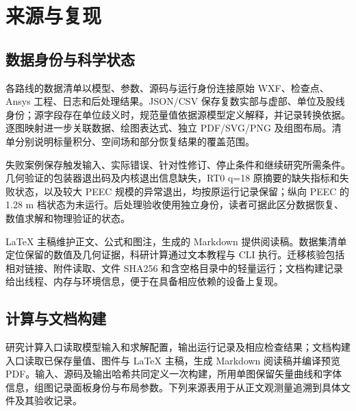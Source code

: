 \section{来源与复现}
\label{chapter:S3}

\hypertarget{S3.report_repro.heading}{}
\subsection{数据身份与科学状态}

\hypertarget{S3.report_repro.p1}{}
各路线的数据清单以模型、参数、源码与运行身份连接原始 WXF、检查点、Ansys 工程、日志和后处理结果。JSON/CSV 保存复数实部与虚部、单位及股线身份；源字段存在单位歧义时，规范量值依据源模型定义解释，并记录转换依据。逐图映射进一步关联数据、绘图表达式、独立 PDF/SVG/PNG 及组图布局。清单分别说明标量积分、空间场和部分恢复结果的覆盖范围。

\hypertarget{S3.report_repro.p2}{}
失败案例保存触发输入、实际错误、针对性修订、停止条件和继续研究所需条件。几何验证的包装器退出码及内核退出信息缺失，RT0 q=18 原摘要的缺失指标和失败状态，以及较大 PEEC 规模的异常退出，均按原运行记录保留；纵向 PEEC 的 1.28 m 档状态为未运行。后处理验收使用独立身份，读者可据此区分数据恢复、数值求解和物理验证的状态。

\hypertarget{S3.report_repro.p3}{}
LaTeX 主稿维护正文、公式和图注，生成的 Markdown 提供阅读稿。数据集清单定位保留的数值及几何证据，科研计算通过文本教程与 CLI 执行。迁移核验包括相对链接、附件读取、文件 SHA256 和含空格目录中的轻量运行；文档构建记录给出线程、内存与环境信息，便于在具备相应依赖的设备上复现。

\hypertarget{S3.workflow.heading}{}
\subsection{计算与文档构建}

\hypertarget{S3.workflow.p1}{}
研究计算入口读取模型输入和求解配置，输出运行记录及相应检查结果；文档构建入口读取已保存量值、图件与 LaTeX 主稿，生成 Markdown 阅读稿并编译预览 PDF。输入、源码及输出哈希共同定义一次构建，所用单图保留矢量曲线和字体信息，组图记录面板身份与布局参数。下列来源表用于从正文观测量追溯到具体文件及其验收记录。

